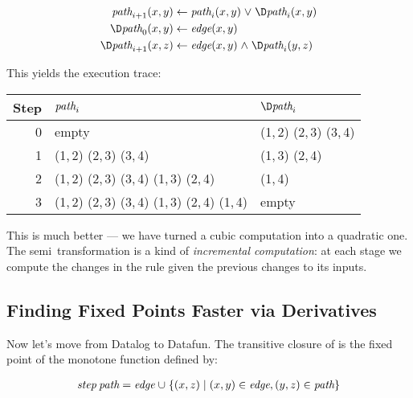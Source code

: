 \begin{align*}
  \name{path}_{i+1}(x,y) &\gets \name{path}_i(x,y) \vee \D\name{path}_i(x,y)
  \\
  \D\name{path}_0(x,y) &\gets \name{edge}(x,y)
  \\
  \D\name{path}_{i+1}(x,z) &\gets \name{edge}(x,y) \wedge \D\name{path}_i(y,z)
\end{align*}

\noindent This yields the execution trace:

\begin{center}
  \setlength\tabcolsep{1em}
  \def\arraystretch{1.1}
  \begin{tabular}{@{}rll@{}}
    Step & $\text{\itshape path}_i$ & $\D\name{path}_i$
    \\\midrule
    0 & empty & (1,\,2) (2,\,3) (3,\,4)
    \\
    1 & (1,\,2) (2,\,3) (3,\,4) & (1,\,3) (2,\,4)
    \\
    2 & (1,\,2) (2,\,3) (3,\,4) (1,\,3) (2,\,4) & (1,\,4)
    \\
    3 & (1,\,2) (2,\,3) (3,\,4) (1,\,3) (2,\,4) (1,\,4) & empty
  \end{tabular}
\end{center}

This is much better --- we have turned a cubic computation into a quadratic one.
%
The semi\naive\ transformation is a kind of \emph{incremental computation}: at
each stage we compute the changes in the rule given the previous changes to its
inputs.
%


\subsection{Finding Fixed Points Faster via Derivatives}

Now let's move from Datalog to Datafun. The transitive closure of  is
the fixed point of the monotone function  defined by:

\nopagebreak[2]
\[\begin{array}{l}
  \name{step} \<\name{path} = \name{edge} \cup
  \setfor{(x,z)}{(x,y) \in \name{edge}, (y,z) \in \name{path}}
\end{array}\]

